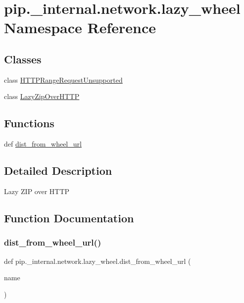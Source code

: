 \hypertarget{namespacepip_1_1__internal_1_1network_1_1lazy__wheel}{}\section{pip.\+\_\+internal.\+network.\+lazy\+\_\+wheel Namespace Reference}
\label{namespacepip_1_1__internal_1_1network_1_1lazy__wheel}
\subsection*{Classes}
\begin{DoxyCompactItemize}
\item 
class \hyperlink{classpip_1_1__internal_1_1network_1_1lazy__wheel_1_1HTTPRangeRequestUnsupported}{H\+T\+T\+P\+Range\+Request\+Unsupported}
\item 
class \hyperlink{classpip_1_1__internal_1_1network_1_1lazy__wheel_1_1LazyZipOverHTTP}{Lazy\+Zip\+Over\+H\+T\+TP}
\end{DoxyCompactItemize}
\subsection*{Functions}
\begin{DoxyCompactItemize}
\item 
def \hyperlink{namespacepip_1_1__internal_1_1network_1_1lazy__wheel_a0fda90a2f9007cf55216f3a9bac0a2fd}{dist\+\_\+from\+\_\+wheel\+\_\+url}
\end{DoxyCompactItemize}


\subsection{Detailed Description}
\begin{DoxyVerb}Lazy ZIP over HTTP\end{DoxyVerb}
 

\subsection{Function Documentation}
\mbox{\label{namespacepip_1_1__internal_1_1network_1_1lazy__wheel_a0fda90a2f9007cf55216f3a9bac0a2fd}} 
\subsubsection{\texorpdfstring{dist\+\_\+from\+\_\+wheel\+\_\+url()}{dist\_from\_wheel\_url()}}
{\footnotesize\ttfamily def pip.\+\_\+internal.\+network.\+lazy\+\_\+wheel.\+dist\+\_\+from\+\_\+wheel\+\_\+url (\begin{DoxyParamCaption}\item[{}]{name }\end{DoxyParamCaption})}

